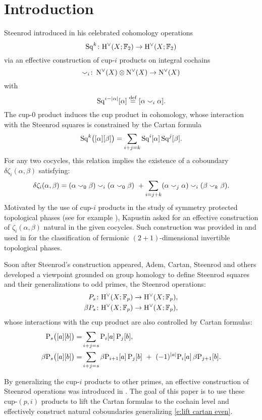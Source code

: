 
\section{Introduction} \label{s:introduction}

Steenrod introduced in \cite{steenrod1947products} his celebrated cohomology operations
\begin{equation*}
	\operatorname{Sq}^k \colon \mathrm{H}^\vee(X; {\mathbb{F}_2}) \to \mathrm{H}^\vee(X; {\mathbb{F}_2})
\end{equation*}
via an effective construction of cup-$i$ products on integral cochains
\[
\smallsmile_i \colon \operatorname{N^{\vee}}(X) \otimes \operatorname{N^{\vee}}(X) \to \operatorname{N^{\vee}}(X)
\]
with
\[
\operatorname{Sq}^{i-\lvert\alpha\rvert}[\alpha] \stackrel{\mathrm{def}}{=} [\alpha \smallsmile_i \alpha].
\]
The cup-$0$ product induces the cup product in cohomology, whose interaction with the Steenrod squares is constrained by the Cartan formula
\[
\operatorname{Sq}^k\!\big([\alpha] [\beta]\big) = \sum_{i+j=k} \operatorname{Sq}^i [\alpha] \operatorname{Sq}^j[\beta].
\]
For any two cocycles, this relation implies the existence of a coboundary $\delta\zeta_i(\alpha,\beta)$ satisfying:
\begin{equation}\label{e:lift cartan even}
	\delta\zeta_i(\alpha, \beta) =
	(\alpha \smallsmile_0 \beta) \smallsmile_i (\alpha \smallsmile_0 \beta) \ +
	\sum_{i=j+k} (\alpha \smallsmile_j \alpha) \smallsmile_i (\beta \smallsmile_k \beta).
\end{equation}
Motivated by the use of cup-$i$ products in the study of symmetry protected topological phases (see for example \cite{kapustin2015cobordism, gaiotto2016spin, kapustin2017fermionic}), Kapustin asked for an effective construction of $\zeta_i(\alpha, \beta)$ natural in the given cocycles.
Such construction was provided in \cite{medina2020cartan} and used in \cite{barkeshli2021classification} for the classification of fermionic $(2+1)$-dimensional invertible topological phases.

Soon after Steenrod's construction appeared, Adem, Cartan, Steenrod and others developed a viewpoint grounded on group homology to define Steenrod squares and their generalizations to odd primes, the Steenrod operations:
\begin{align*}
	P_s \colon& \mathrm{H}^\vee(X; {\mathbb{F}_p}) \to \mathrm{H}^\vee(X; {\mathbb{F}_p}), \\
	\beta P_s \colon& \mathrm{H}^\vee(X; {\mathbb{F}_p}) \to \mathrm{H}^\vee(X; {\mathbb{F}_p}),
\end{align*}
whose interactions with the cup product are also controlled by Cartan formulas:
\begin{align*}
	\mathrm{P}_s\big([a][b]\big) =&
	\sum_{i+j=s} \mathrm{P}_i[a] \, \mathrm{P}_j[b], \\
	\beta\mathrm{P}_s\big([a][b]\big) =&
	\sum_{i+j=s} \beta\mathrm{P}_{i+1}[a] \, \mathrm{P}_j[b] \ +\ (-1)^{\lvert a\rvert} \mathrm{P}_i[a] \, \beta\mathrm{P}_{j+1}[b].
\end{align*}

By generalizing the cup-$i$ products to other primes, an effective construction of Steenrod operations was introduced in \cite{medina2021may_st}.
The goal of this paper is to use these cup-$(p,i)$ products to lift the Cartan formulas to the cochain level and effectively construct natural coboundaries generalizing \cref{e:lift cartan even}.